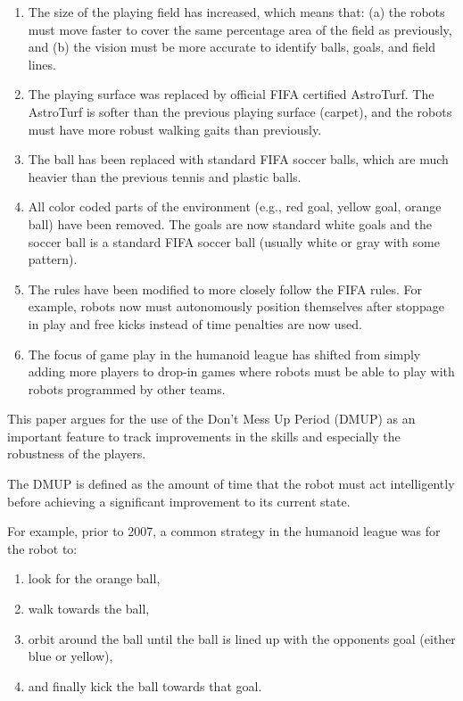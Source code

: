 \documentclass[runningheads]{llncs}
\begin{document}
\begin{enumerate}
\item The size of the playing field has increased, which means that: (a) the robots must move faster to cover the same percentage area of the field as previously, and (b) the vision must be more accurate to identify balls, goals, and field lines.

\item The playing surface was replaced by official FIFA certified AstroTurf. The AstroTurf is softer than the previous playing surface (carpet), and the robots must have more robust walking gaits than previously.

\item The ball has been replaced with standard FIFA soccer balls, which are much heavier than the previous tennis and plastic balls.

\item All color coded parts of the environment (e.g., red goal, yellow goal, orange ball) have been removed. 
The goals are now standard white goals and the soccer ball is a standard FIFA soccer ball (usually white or gray with some pattern).

\item The rules have been modified to more closely follow the FIFA rules.
For example, robots now must autonomously position themselves after stoppage in play and free kicks instead of time penalties are now used.

\item The focus of game play in the humanoid league has shifted from simply adding more players to drop-in games where robots must be able to play with robots programmed by other teams.

\end{enumerate}

This paper argues for the use of the Don't Mess Up Period (DMUP) as an important feature to track improvements in the skills and especially the robustness of the players.

The DMUP is defined as the amount of time that the robot must act intelligently before achieving a significant improvement to its current state.

For example, prior to 2007, a common strategy in the humanoid league was for the robot to:
\begin{enumerate}
    \item look for the orange ball,
    \item walk towards the ball,
    \item orbit around the ball until the ball is lined up with the opponents goal (either blue or yellow),
    \item and finally kick the ball towards that goal.
\end{enumerate}
\end{document}
